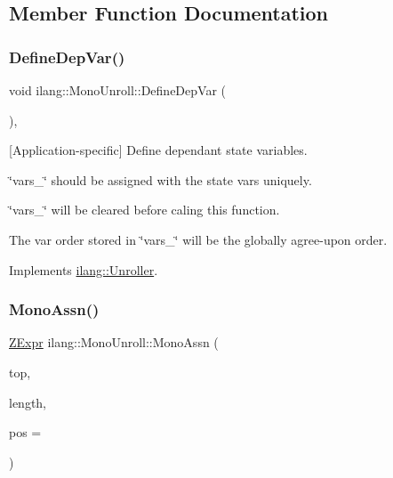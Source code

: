 \subsection{Member Function Documentation}
\mbox{\label{classilang_1_1_mono_unroll_ab983b89c775ba2d12b5a763ac3391c93}} 
\subsubsection{\texorpdfstring{Define\+Dep\+Var()}{DefineDepVar()}}
{\footnotesize\ttfamily void ilang\+::\+Mono\+Unroll\+::\+Define\+Dep\+Var (\begin{DoxyParamCaption}{ }\end{DoxyParamCaption})\hspace{0.3cm}{\ttfamily [protected]}, {\ttfamily [virtual]}}



\mbox{[}Application-\/specific\mbox{]} Define dependant state variables. 


\begin{DoxyItemize}
\item \char`\"{}vars\+\_\+\char`\"{} should be assigned with the state vars uniquely.
\item \char`\"{}vars\+\_\+\char`\"{} will be cleared before caling this function.
\item The var order stored in \char`\"{}vars\+\_\+\char`\"{} will be the globally agree-\/upon order. 
\end{DoxyItemize}

Implements \mbox{\hyperlink{classilang_1_1_unroller_a97361e0a881ea09d32153166ef41dd82}{ilang\+::\+Unroller}}.

\mbox{\label{classilang_1_1_mono_unroll_ab880d6b2993eeeb4a2fdbd89f3089838}} 
\subsubsection{\texorpdfstring{Mono\+Assn()}{MonoAssn()}}
{\footnotesize\ttfamily \mbox{\hyperlink{classilang_1_1_unroller_a9fd0359e3ffd666f8f92ad3c3ef52673}{Z\+Expr}} ilang\+::\+Mono\+Unroll\+::\+Mono\+Assn (\begin{DoxyParamCaption}\item[{const \mbox{\hyperlink{namespaceilang_ad1b30fdf347e493b3937143da05d1a72}{Instr\+Lvl\+Abs\+Ptr}}}]{top,  }\item[{const int \&}]{length,  }\item[{const int \&}]{pos = {} }\end{DoxyParamCaption})}



